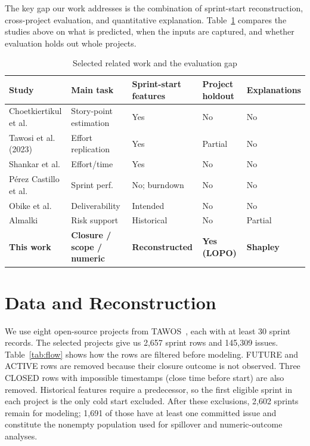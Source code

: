 \documentclass[conference]{IEEEtran}
\begin{document}
The key gap our work addresses is the combination of sprint-start reconstruction, cross-project evaluation, and quantitative explanation.
Table~\ref{tab:related} compares the studies above on what is predicted, when the inputs are captured, and whether evaluation holds out whole projects.

\begin{table}[!htb]
\centering\scriptsize
\caption{Selected related work and the evaluation gap}
\label{tab:related}
\setlength{\tabcolsep}{1.8pt}
\begin{tabular}{@{}p{1.3cm}p{1.4cm}p{1.1cm}p{0.9cm}p{1.0cm}@{}}
\toprule
Study & Main task & Sprint-start features & Project holdout & Explanations\\
\midrule
Choetkiertikul et al. & Story-point estimation & Yes & No & No\\
Tawosi et al. (2023) & Effort replication & Yes & Partial & No\\
Shankar et al. & Effort/time & Yes & No & No\\
P\'{e}rez Castillo et al. & Sprint perf. & No; burndown & No & No\\
Obike et al. & Deliverability & Intended & No & No\\
Almalki & Risk support & Historical & No & Partial\\
\textbf{This work} & \textbf{Closure / scope / numeric} & \textbf{Reconstructed} & \textbf{Yes (LOPO)} & \textbf{Shapley}\\
\bottomrule
\end{tabular}
\end{table}

\section{Data and Reconstruction}

We use eight open-source projects from TAWOS~\cite{tawosi2022}, each with at least 30 sprint records.
The selected projects give us 2,657 sprint rows and 145,309 issues.
Table~\ref{tab:flow} shows how the rows are filtered before modeling.
FUTURE and ACTIVE rows are removed because their closure outcome is not observed.
Three CLOSED rows with impossible timestamps (close time before start) are also removed.
Historical features require a predecessor, so the first eligible sprint in each project is the only cold start excluded.
After these exclusions, 2,602 sprints remain for modeling; 1,691 of those have at least one committed issue and constitute the nonempty population used for spillover and numeric-outcome analyses.
\end{document}
